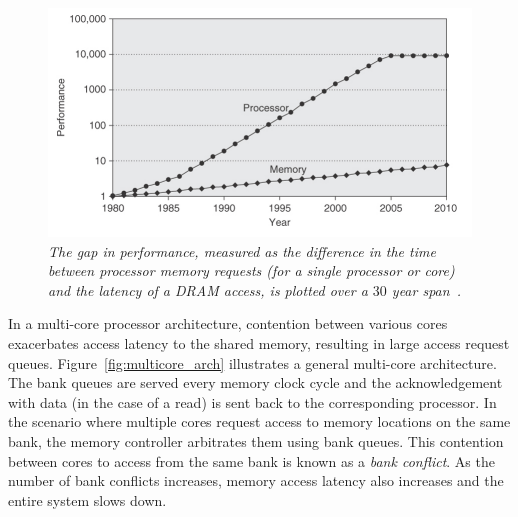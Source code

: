 \begin{figure}[t!]
\centering
\includegraphics[width=0.7\linewidth]{fig/cpuvsmemory.jpg}
\caption{\it{The gap in performance, measured as the difference in the time 
between processor memory requests (for a single processor or core) and the 
latency of a DRAM access, is plotted over a $30$ year span~\cite{comparchbook}.}}
\label{fig:cpuvsmemory}
\end{figure}
In a multi-core processor architecture, contention between various cores exacerbates access latency to the shared memory, resulting in large access request queues. 
Figure~\ref{fig:multicore_arch}  illustrates a general multi-core architecture. The bank queues are 
served every memory clock cycle and the acknowledgement with data (in the case of a 
read) is sent back to the corresponding processor. In the scenario where multiple cores request access to memory locations on the same bank, the memory controller arbitrates them using bank queues. This contention between cores to access from the same bank is known as a {\em bank conflict}. 
As the number of bank conflicts increases, memory access latency also increases and the entire system slows down. 

